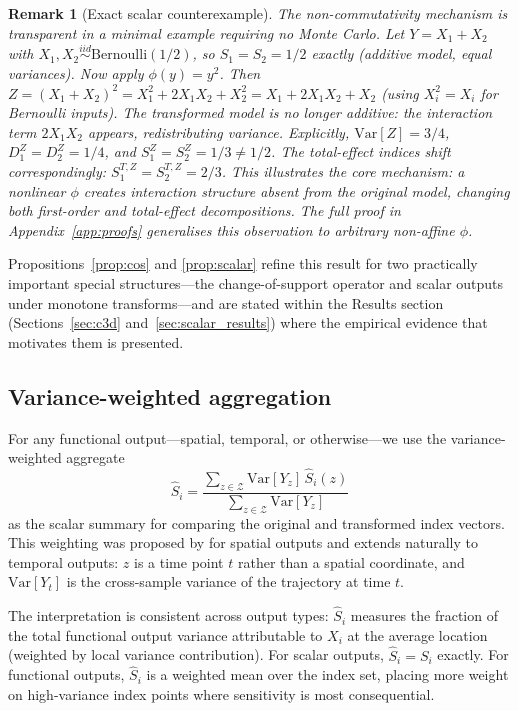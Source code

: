 \documentclass[11pt,onecolumn]{article}
\newtheorem{remark}{Remark}
\begin{document}
\begin{remark}[Exact scalar counterexample]
\label{rem:toy}
The non-commutativity mechanism is transparent in a minimal example requiring
no Monte Carlo.  Let $Y = X_1 + X_2$ with $X_1, X_2 \stackrel{iid}{\sim}
\mathrm{Bernoulli}(1/2)$, so $S_1 = S_2 = 1/2$ exactly (additive model,
equal variances).  Now apply $\phi(y) = y^2$.  Then
$Z = (X_1 + X_2)^2 = X_1^2 + 2X_1 X_2 + X_2^2 = X_1 + 2X_1 X_2 + X_2$
(using $X_i^2 = X_i$ for Bernoulli inputs).  The transformed model is no
longer additive: the interaction term $2X_1 X_2$ appears, redistributing
variance.  Explicitly, $\mathrm{Var}[Z] = 3/4$,
$D_1^Z = D_2^Z = 1/4$, and $S_1^Z = S_2^Z = 1/3 \neq 1/2$.  The
total-effect indices shift correspondingly: $S_1^{T,Z} = S_2^{T,Z} = 2/3$.
This illustrates the core mechanism: a nonlinear $\phi$ creates interaction
structure absent from the original model, changing both first-order and
total-effect decompositions.  The full proof in Appendix~\ref{app:proofs}
generalises this observation to arbitrary non-affine $\phi$.
\end{remark}

Propositions~\ref{prop:cos} and \ref{prop:scalar} refine this result for two
practically important special structures---the change-of-support operator and scalar
outputs under monotone transforms---and are stated within the Results section
(Sections~\ref{sec:c3d} and~\ref{sec:scalar_results}) where the empirical evidence
that motivates them is presented.

\subsection{Variance-weighted aggregation}
\label{sec:vw_agg}

For any functional output---spatial, temporal, or otherwise---we use the
variance-weighted aggregate
\begin{equation}
  \hat{S}_i = \frac{\sum_{z \in \mathcal{Z}} \mathrm{Var}[Y_z]\, \hat{S}_i(z)}
                   {\sum_{z \in \mathcal{Z}} \mathrm{Var}[Y_z]}
  \label{eq:vw}
\end{equation}
as the scalar summary for comparing the original and transformed index vectors.
This weighting was proposed by \citet{MarrelSpatial2011} for spatial outputs and
extends naturally to temporal outputs: $z$ is a time point $t$ rather than a
spatial coordinate, and $\mathrm{Var}[Y_t]$ is the cross-sample variance of
the trajectory at time $t$.

The interpretation is consistent across output types: $\hat{S}_i$ measures
the fraction of the total functional output variance attributable to $X_i$
at the average location (weighted by local variance contribution).
For scalar outputs, $\hat{S}_i = S_i$ exactly.
For functional outputs, $\hat{S}_i$ is a weighted mean over the index set,
placing more weight on high-variance index points where sensitivity is most
consequential.
\end{document}
